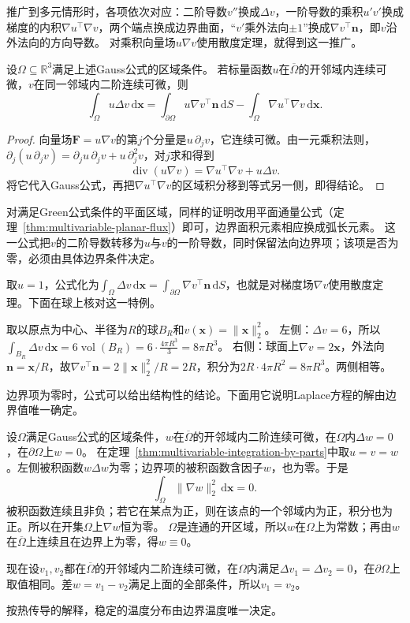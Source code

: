 推广到多元情形时，各项依次对应：二阶导数$v''$换成$\Delta v$，一阶导数的乘积$u'v'$换成梯度的内积$\nabla u^\top\nabla v$，两个端点换成边界曲面，“$v'$乘外法向$\pm1$”换成$\nabla v^\top\bm n$，即$v$沿外法向的方向导数。
对乘积向量场$u\nabla v$使用散度定理，就得到这一推广。
\begin{theorem}[多元分部积分]
\label{thm:multivariable-integration-by-parts}
设$\Omega\subseteq\mathbb R^3$满足上述Gauss公式的区域条件。
若标量函数$u$在$\overline\Omega$的开邻域内连续可微，$v$在同一邻域内二阶连续可微，则
\[
 \int_\Omega u\Delta v\,\mathrm d\bm x
 =\int_{\partial\Omega}u\nabla v^\top\bm n\,\mathrm dS
  -\int_\Omega\nabla u^\top\nabla v\,\mathrm d\bm x.
\]
\end{theorem}
\begin{proof}
向量场$\bm F=u\nabla v$的第$j$个分量是$u\,\partial_jv$，它连续可微。由一元乘积法则，
$\partial_j(u\,\partial_jv)=\partial_ju\,\partial_jv+u\,\partial_j^2v$，对$j$求和得到
\[
 \operatorname{div}(u\nabla v)
 =\nabla u^\top\nabla v+u\Delta v.
\]
将它代入Gauss公式，再把$\nabla u^\top\nabla v$的区域积分移到等式另一侧，即得结论。
\end{proof}
对满足Green公式条件的平面区域，同样的证明改用平面通量公式（定理~\ref{thm:multivariable-planar-flux}）即可，边界面积元素相应换成弧长元素。
这一公式把$v$的二阶导数转移为$u$与$v$的一阶导数，同时保留法向边界项；该项是否为零，必须由具体边界条件决定。

取$u=1$，公式化为$\int_\Omega\Delta v\,\mathrm d\bm x=\int_{\partial\Omega}\nabla v^\top\bm n\,\mathrm dS$，也就是对梯度场$\nabla v$使用散度定理。下面在球上核对这一特例。
\begin{example}[球上平方范数的Laplace积分]
取以原点为中心、半径为$R$的球$B_R$和$v(\bm x)=\lVert\bm x\rVert_2^2$。
左侧：$\Delta v=6$，所以$\int_{B_R}\Delta v\,\mathrm d\bm x=6\operatorname{vol}(B_R)=6\cdot\frac{4\pi R^3}3=8\pi R^3$。
右侧：球面上$\nabla v=2\bm x$，外法向$\bm n=\bm x/R$，故$\nabla v^\top\bm n=2\lVert\bm x\rVert_2^2/R=2R$，积分为$2R\cdot4\pi R^2=8\pi R^3$。两侧相等。
\end{example}

边界项为零时，公式可以给出结构性的结论。下面用它说明Laplace方程的解由边界值唯一确定。
\begin{example}[Laplace方程的解由边界值决定]
设$\Omega$满足Gauss公式的区域条件，$w$在$\overline\Omega$的开邻域内二阶连续可微，在$\Omega$内$\Delta w=0$，在$\partial\Omega$上$w=0$。
在定理~\ref{thm:multivariable-integration-by-parts}中取$u=v=w$。左侧被积函数$w\Delta w$为零；边界项的被积函数含因子$w$，也为零。于是
\[
 \int_\Omega\lVert\nabla w\rVert_2^2\,\mathrm d\bm x=0.
\]
被积函数连续且非负；若它在某点为正，则在该点的一个邻域内为正，积分也为正。所以在开集$\Omega$上$\nabla w$恒为零。
$\Omega$是连通的开区域，所以$w$在$\Omega$上为常数；再由$w$在$\overline\Omega$上连续且在边界上为零，得$w\equiv0$。

现在设$v_1,v_2$都在$\overline\Omega$的开邻域内二阶连续可微，在$\Omega$内满足$\Delta v_1=\Delta v_2=0$，在$\partial\Omega$上取值相同。差$w=v_1-v_2$满足上面的全部条件，所以$v_1=v_2$。
\end{example}
按热传导的解释，稳定的温度分布由边界温度唯一决定。

